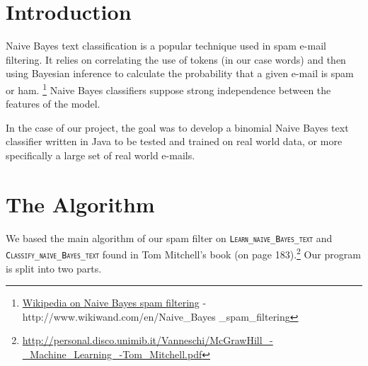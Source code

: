 \documentclass[12pt,a4paper]{report}
\begin{document}
\tableofcontents

\section{Introduction}
Naive Bayes text classification is a popular technique used in spam e-mail filtering. It relies on correlating the use of tokens (in our case words) and then using Bayesian inference to calculate the probability that a given e-mail is spam or ham. \footnote{\href{http://www.wikiwand.com/en/Naive\_Bayes\_spam\_filtering}{Wikipedia on Naive Bayes spam filtering} -  http://www.wikiwand.com/en/Naive\_Bayes \_spam\_filtering}
Naive Bayes classifiers suppose strong independence between the features of the model.

In the case of our project, the goal was to develop a binomial Naive Bayes text classifier written in Java to be tested and trained on real world data, or more specifically a large set of real world e-mails.

\section{The Algorithm}
We based the main algorithm of our spam filter on  \texttt{\textsc{Learn\_naive\_Bayes\_text}} and \texttt{\textsc{Classify\_naive\_Bayes\_text}} found in Tom Mitchell's book (on page 183).\footnote{\href{http://personal.disco.unimib.it/Vanneschi/McGrawHill\_-\_Machine\_Learning\_-Tom\_Mitchell.pdf}{http://personal.disco.unimib.it/Vanneschi/McGrawHill\_-\_Machine\_Learning\_-Tom\_Mitchell.pdf}} 
Our program is split into two parts.
\end{document}
